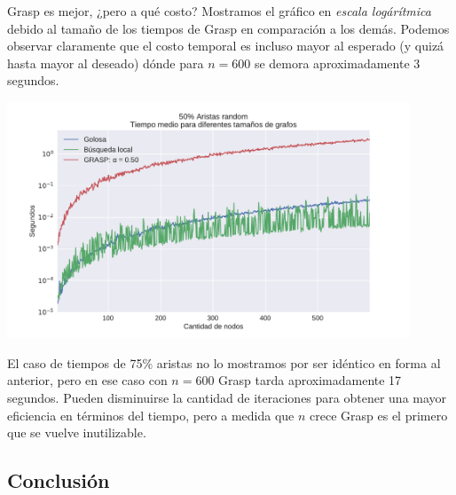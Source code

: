 Grasp es mejor, ¿pero a qué costo? Mostramos el gráfico en \textit{escala logárítmica} debido al tamaño de los tiempos de Grasp en comparación a los demás. Podemos observar claramente que el costo temporal es incluso mayor al esperado (y quizá hasta mayor al deseado) dónde para $n = 600$ se demora aproximadamente 3 segundos.

{\centering
    \includegraphics[width=0.9\textwidth]{informe/imgs/exp_random50_tiempo_todos_ngrande_logy.pdf}
}

El caso de tiempos de 75\% aristas no lo mostramos por ser idéntico en forma al anterior, pero en ese caso con $n = 600$ Grasp tarda aproximadamente 17 segundos. Pueden disminuirse la cantidad de iteraciones para obtener una mayor eficiencia en términos del tiempo, pero a medida que $n$ crece Grasp es el primero que se vuelve inutilizable.



\subsection{Conclusión}



